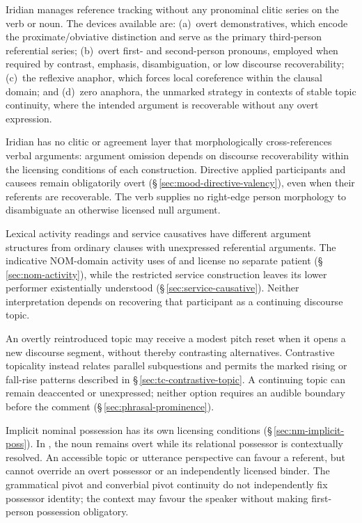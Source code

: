 Iridian manages reference tracking without any pronominal clitic series on the
verb or noun. The devices available are: (a)~overt demonstratives, which encode
the proximate/obviative distinction and serve as the primary third-person
referential series; (b)~overt first- and second-person pronouns, employed when
required by contrast, emphasis, disambiguation, or low discourse recoverability;
(c)~the reflexive anaphor, which forces local coreference within the clausal
domain; and (d)~zero anaphora, the unmarked strategy in contexts of stable topic
continuity, where the intended argument is recoverable
without any overt expression.

Iridian has no clitic or agreement layer that morphologically
cross-references verbal arguments: argument omission depends on discourse
recoverability within the licensing conditions of each construction. Directive
applied participants and causees remain obligatorily overt
(§\,\ref{sec:mood-directive-valency}), even when their referents are
recoverable. The verb supplies no right-edge person morphology to
disambiguate an otherwise licensed null argument.

Lexical activity readings and service causatives have different argument
structures from ordinary clauses with unexpressed referential arguments.
The indicative NOM-domain activity uses of  and  license no
separate patient (§\,\ref{sec:nom-activity}), while the restricted service
construction leaves its lower performer existentially understood
(§\,\ref{sec:service-causative}). Neither interpretation depends on
recovering that participant as a continuing discourse topic.

An overtly reintroduced topic may receive a modest pitch reset when it
 opens a new discourse segment, without thereby contrasting alternatives.
 Contrastive topicality instead relates parallel subquestions and permits
 the marked rising or fall-rise patterns described in
 §\,\ref{sec:tc-contrastive-topic}. A continuing topic can remain
 deaccented or unexpressed; neither option requires an audible boundary
 before the comment (§\,\ref{sec:phrasal-prominence}).

Implicit nominal possession has its own licensing conditions
(§\,\ref{sec:nm-implicit-poss}). In  ,
the noun remains overt while its relational possessor is contextually
resolved. An accessible topic or utterance perspective can favour a referent,
but cannot override an overt possessor or an independently licensed binder.
The grammatical pivot and converbial pivot continuity do not independently
fix possessor identity; the context may favour the speaker without making
first-person possession obligatory.

